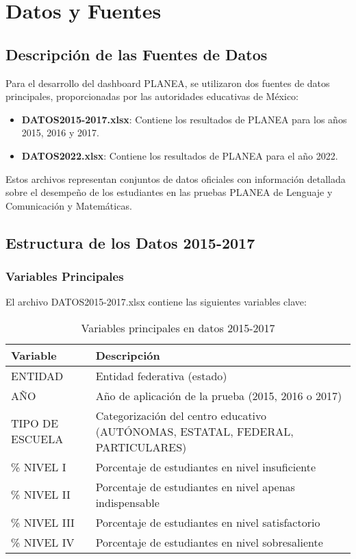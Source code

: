 \chapter{Datos y Fuentes}

\section{Descripción de las Fuentes de Datos}
Para el desarrollo del dashboard PLANEA, se utilizaron dos fuentes de datos principales, proporcionadas por las autoridades educativas de México:

\begin{itemize}
    \item \textbf{DATOS2015-2017.xlsx}: Contiene los resultados de PLANEA para los años 2015, 2016 y 2017.
    \item \textbf{DATOS2022.xlsx}: Contiene los resultados de PLANEA para el año 2022.
\end{itemize}

Estos archivos representan conjuntos de datos oficiales con información detallada sobre el desempeño de los estudiantes en las pruebas PLANEA de Lenguaje y Comunicación y Matemáticas.

\section{Estructura de los Datos 2015-2017}

\subsection{Variables Principales}
El archivo DATOS2015-2017.xlsx contiene las siguientes variables clave:

\begin{table}[h]
\centering
\begin{tabular}{|p{4cm}|p{8cm}|}
\hline
\textbf{Variable} & \textbf{Descripción} \\
\hline
ENTIDAD & Entidad federativa (estado) \\
\hline
AÑO & Año de aplicación de la prueba (2015, 2016 o 2017) \\
\hline
TIPO DE ESCUELA & Categorización del centro educativo (AUTÓNOMAS, ESTATAL, FEDERAL, PARTICULARES) \\
\hline
\% NIVEL I & Porcentaje de estudiantes en nivel insuficiente \\
\hline
\% NIVEL II & Porcentaje de estudiantes en nivel apenas indispensable \\
\hline
\% NIVEL III & Porcentaje de estudiantes en nivel satisfactorio \\
\hline
\% NIVEL IV & Porcentaje de estudiantes en nivel sobresaliente \\
\hline
\end{tabular}
\caption{Variables principales en datos 2015-2017}
\label{tabla:variables2015}
\end{table}

